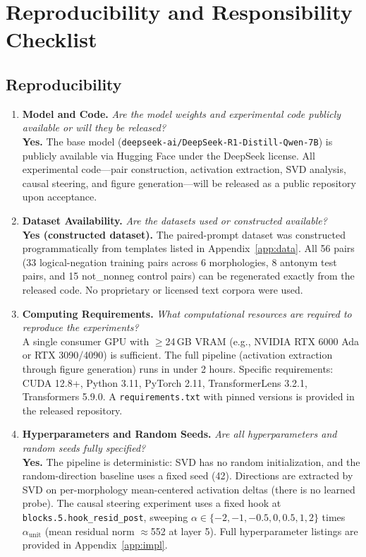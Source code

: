 
\section*{Reproducibility and Responsibility Checklist}

\subsection*{Reproducibility}

\begin{enumerate}

\item \textbf{Model and Code.}
\textit{Are the model weights and experimental code publicly available or will they be released?} \\
\textbf{Yes.} The base model (\texttt{deepseek-ai/DeepSeek-R1-Distill-Qwen-7B}) is publicly available via Hugging Face under the DeepSeek license. All experimental code---pair construction, activation extraction, SVD analysis, causal steering, and figure generation---will be released as a public repository upon acceptance.

\item \textbf{Dataset Availability.}
\textit{Are the datasets used or constructed available?} \\
\textbf{Yes (constructed dataset).} The paired-prompt dataset was constructed programmatically from templates listed in Appendix~\ref{app:data}. All 56 pairs (33 logical-negation training pairs across 6 morphologies, 8 antonym test pairs, and 15 not\_nonneg control pairs) can be regenerated exactly from the released code. No proprietary or licensed text corpora were used.

\item \textbf{Computing Requirements.}
\textit{What computational resources are required to reproduce the experiments?} \\
A single consumer GPU with $\geq$24\,GB VRAM (e.g., NVIDIA RTX 6000 Ada or RTX 3090/4090) is sufficient. The full pipeline (activation extraction through figure generation) runs in under 2 hours. Specific requirements: CUDA 12.8+, Python 3.11, PyTorch 2.11, TransformerLens 3.2.1, Transformers 5.9.0. A \texttt{requirements.txt} with pinned versions is provided in the released repository.

\item \textbf{Hyperparameters and Random Seeds.}
\textit{Are all hyperparameters and random seeds fully specified?} \\
\textbf{Yes.} The pipeline is deterministic: SVD has no random initialization, and the random-direction baseline uses a fixed seed (42). Directions are extracted by SVD on per-morphology mean-centered activation deltas (there is no learned probe). The causal steering experiment uses a fixed hook at \texttt{blocks.5.hook\_resid\_post}, sweeping $\alpha \in \{-2, -1, -0.5, 0, 0.5, 1, 2\}$ times $\alpha_{\mathrm{unit}}$ (mean residual norm $\approx$552 at layer 5). Full hyperparameter listings are provided in Appendix~\ref{app:impl}.


\end{enumerate}
